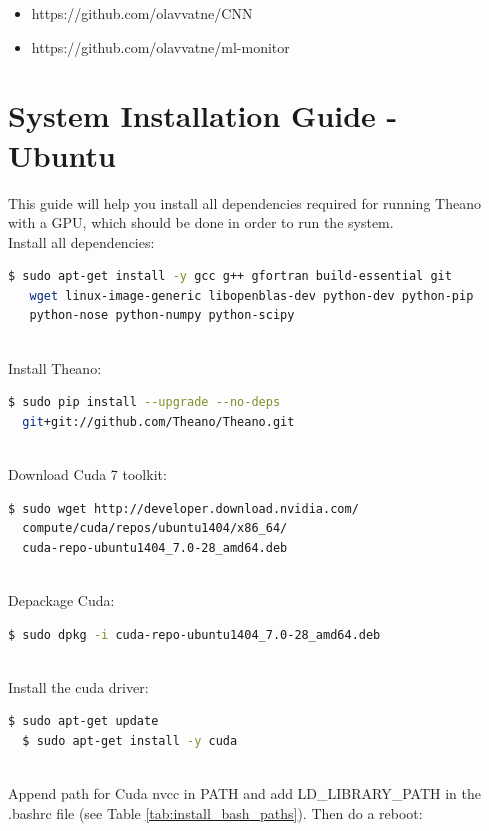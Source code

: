 \begin{itemize}
\item https://github.com/olavvatne/CNN
\item https://github.com/olavvatne/ml-monitor
\end{itemize} 


\section{System Installation Guide - Ubuntu}
\label{app:ubuntuInstall}
This guide will help you install all dependencies required for running Theano with a GPU, which should be done in order to run the system. \\
\noindent Install all dependencies:
\begin{lstlisting}[language=bash]
  $ sudo apt-get install -y gcc g++ gfortran build-essential git
   wget linux-image-generic libopenblas-dev python-dev python-pip 
   python-nose python-numpy python-scipy  
\end{lstlisting}
~\\

\noindent Install Theano:
\begin{lstlisting}[language=bash]
  $ sudo pip install --upgrade --no-deps 
  git+git://github.com/Theano/Theano.git
\end{lstlisting}
~\\

\noindent Download Cuda 7 toolkit:
\begin{lstlisting}[language=bash]
  $ sudo wget http://developer.download.nvidia.com/
  compute/cuda/repos/ubuntu1404/x86_64/
  cuda-repo-ubuntu1404_7.0-28_amd64.deb
\end{lstlisting}
~\\

\noindent Depackage Cuda:
\begin{lstlisting}[language=bash]
  $ sudo dpkg -i cuda-repo-ubuntu1404_7.0-28_amd64.deb  
\end{lstlisting}
~\\

\noindent Install the cuda driver:
\begin{lstlisting}[language=bash]
  $ sudo apt-get update
  $ sudo apt-get install -y cuda  
\end{lstlisting}
~\\

\noindent Append path for Cuda nvcc in PATH and add LD\_LIBRARY\_PATH in the .bashrc file (see Table \ref{tab:install_bash_paths}). Then do a reboot:

